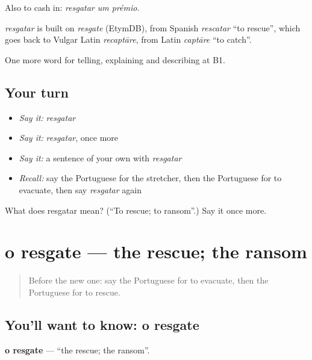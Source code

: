 Also to cash in: \emph{resgatar um prémio}.

\begin{cousinweb}
\emph{resgatar} is built on \emph{resgate} (EtymDB), from Spanish \emph{rescatar} \textquotedblleft{}to rescue\textquotedblright{}, which goes back to Vulgar Latin \emph{recaptāre}, from Latin \emph{captāre} \textquotedblleft{}to catch\textquotedblright{}.
\end{cousinweb}

\begin{grammarlens}[title={What you've built}]
One more word for telling, explaining and describing at B1.
\end{grammarlens}

\subsection*{Your turn}
\begin{itemize}
\raggedright
  \item \emph{Say it:} \emph{resgatar}
  \item \emph{Say it:} \emph{resgatar}, once more
  \item \emph{Say it:} a sentence of your own with \emph{resgatar}
  \item \emph{Recall:} say the Portuguese for the stretcher, then the Portuguese for to evacuate, then say \emph{resgatar} again
\end{itemize}

\begin{tcolorbox}[breakable,colback=teal!4,colframe=teal!35!black,title={Before you move on}]
What does resgatar mean? (\textquotedblleft{}To rescue; to ransom\textquotedblright{}.) Say it once more.
\end{tcolorbox}
\section[o resgate]{o resgate — the rescue; the ransom}

\label{lesson:PT-C306-resgate}



\begin{quote}
Before the new one: say the Portuguese for to evacuate, then the Portuguese for to rescue.
\end{quote}

\subsection*{You'll want to know: o resgate}
\textbf{o resgate} — \textquotedblleft{}the rescue; the ransom\textquotedblright{}.


